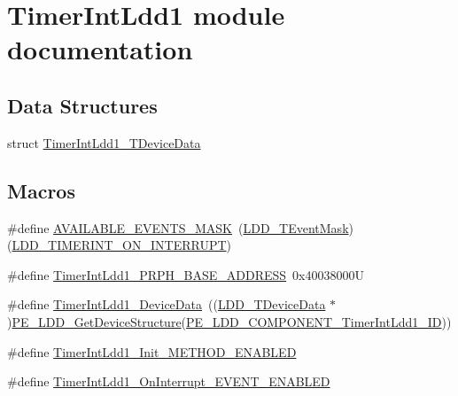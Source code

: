 \hypertarget{group___timer_int_ldd1__module}{}\section{Timer\+Int\+Ldd1 module documentation}
\label{group___timer_int_ldd1__module}
\subsection*{Data Structures}
\begin{DoxyCompactItemize}
\item 
struct \hyperlink{struct_timer_int_ldd1___t_device_data}{Timer\+Int\+Ldd1\+\_\+\+T\+Device\+Data}
\end{DoxyCompactItemize}
\subsection*{Macros}
\begin{DoxyCompactItemize}
\item 
\#define \hyperlink{group___timer_int_ldd1__module_ga5f04a8830cd52a3ffa1678d113f31aee}{A\+V\+A\+I\+L\+A\+B\+L\+E\+\_\+\+E\+V\+E\+N\+T\+S\+\_\+\+M\+A\+SK}~(\hyperlink{group___p_e___types__module_gafbe7f4d4e51560399c3bdd0218584533}{L\+D\+D\+\_\+\+T\+Event\+Mask})(\hyperlink{group___p_e___types__module_gad4a95a8e3f3036e88f99c792431b4d72}{L\+D\+D\+\_\+\+T\+I\+M\+E\+R\+I\+N\+T\+\_\+\+O\+N\+\_\+\+I\+N\+T\+E\+R\+R\+U\+PT})
\item 
\#define \hyperlink{group___timer_int_ldd1__module_gafb6b69926d7c31c7571ad3d945251067}{Timer\+Int\+Ldd1\+\_\+\+P\+R\+P\+H\+\_\+\+B\+A\+S\+E\+\_\+\+A\+D\+D\+R\+E\+SS}~0x40038000U
\item 
\#define \hyperlink{group___timer_int_ldd1__module_ga5029b1a3ee62b1e77252cb5ee432e572}{Timer\+Int\+Ldd1\+\_\+\+Device\+Data}~((\hyperlink{group___p_e___types__module_gac5cf1362f1f0e3a2ce71b1bf2276d091}{L\+D\+D\+\_\+\+T\+Device\+Data} $\ast$)\hyperlink{group___p_e___types__module_gaa1c23d559daef5bcd3327ca83fb56f5a}{P\+E\+\_\+\+L\+D\+D\+\_\+\+Get\+Device\+Structure}(\hyperlink{group___p_e___types__module_ga6a162a05f04f8054d79a9f9dac397d44}{P\+E\+\_\+\+L\+D\+D\+\_\+\+C\+O\+M\+P\+O\+N\+E\+N\+T\+\_\+\+Timer\+Int\+Ldd1\+\_\+\+ID}))
\item 
\#define \hyperlink{group___timer_int_ldd1__module_ga99f1a84b931818260bb4dfad5d071136}{Timer\+Int\+Ldd1\+\_\+\+Init\+\_\+\+M\+E\+T\+H\+O\+D\+\_\+\+E\+N\+A\+B\+L\+ED}
\item 
\#define \hyperlink{group___timer_int_ldd1__module_ga97ee83f24ca8c5f570d5be8bdc0c6dde}{Timer\+Int\+Ldd1\+\_\+\+On\+Interrupt\+\_\+\+E\+V\+E\+N\+T\+\_\+\+E\+N\+A\+B\+L\+ED}
\end{DoxyCompactItemize}
